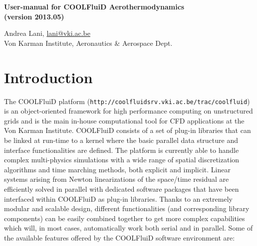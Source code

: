 \documentclass[11pt]{article}
\newcommand{\noi}{\noindent}
\begin{document}
\pagestyle{empty}

\begin{center}
  {\fontsize{14}{20}\bf 
    User-manual for COOLFluiD Aerothermodynamics \\
    (version 2013.05) \\[10pt]}
\end{center}

\begin{center}
  {Andrea Lani, \underline{lani@vki.ac.be} \\
    Von Karman Institute, Aeronautics \& Aerospace Dept.}
\end{center}

\section*{Introduction}

\noi
The COOLFluiD platform ({\tt http://coolfluidsrv.vki.ac.be/trac/coolfluid})
\cite{lani05, lani06, phd:lani, phd:quintino, phd:wuilbaut} is an object-oriented 
framework for high performance computing on unstructured grids and is the main in-house 
computational tool for CFD applications at the Von Karman Institute.
COOLFluiD consists of a set of plug-in libraries that 
can be linked at run-time to a kernel where the basic parallel
data structure and interface functionalities are defined.  
The platform is currently able to handle complex multi-physics simulations
with a wide range of spatial discretization algorithms
and time marching methods, both explicit and implicit.  
Linear systems arising from Newton linearizations of the space/time residual are efficiently solved 
in parallel with dedicated software packages that have been interfaced within COOLFluiD 
as plug-in libraries. Thanks to an extremely modular and scalable design, different 
functionalities (and corresponding library components) can be easily 
combined together to get more complex capabilities which will, in most cases, 
automatically work both serial and in parallel. Some of the available
features offered by the COOLFluiD software environment are:
\end{document}
